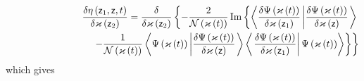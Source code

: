 \begin{eqnarray}
&&\frac{\delta \eta \left( {\sf z}_{1},{\sf z},t\right) }{\delta \varkappa
\left( {\sf z}_{2}\right) }=\frac{\delta }{\delta \varkappa \left( {\sf z}%
_{2}\right) }\left\{ -\frac{2}{{\cal N}\left( {\cal \varkappa }\left(
t\right) \right) }%
\mathop{\rm Im}%
\left\{ \left\langle \frac{\delta \Psi \left( {\cal \varkappa }\left(
t\right) \right) }{\delta {\cal \varkappa }\left( {\sf z}_{1}\right) }\left| 
\frac{\delta \Psi \left( {\cal \varkappa }\left( t\right) \right) }{\delta 
{\cal \varkappa }\left( {\sf z}\right) }\right. \right\rangle \right. \right.
\nonumber \\
&&\qquad \qquad \qquad \qquad \left. \left. -\frac{1}{{\cal N}\left( {\cal %
\varkappa }\left( t\right) \right) }\left\langle \Psi \left( {\cal \varkappa 
}\left( t\right) \right) \left| \frac{\delta \Psi \left( {\cal \varkappa }%
\left( t\right) \right) }{\delta {\cal \varkappa }\left( {\sf z}\right) }%
\right. \right\rangle \left\langle \left. \frac{\delta \Psi \left( {\cal %
\varkappa }\left( t\right) \right) }{\delta {\cal \varkappa }\left( {\sf z}%
_{1}\right) }\right| \Psi \left( {\cal \varkappa }\left( t\right) \right)
\right\rangle \right\} \right\}
\end{eqnarray}%
which gives 
